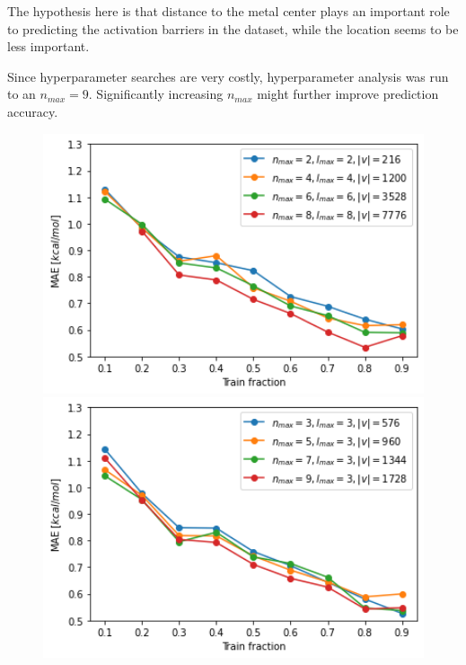 The hypothesis here is that distance to the metal center plays an important role to predicting the activation
barriers in the dataset, while the location seems to be less important.

Since hyperparameter searches are very costly, hyperparameter analysis was run to an $n_{max} = 9$.
Significantly increasing $n_{max}$ might further improve prediction accuracy.

\begin{figure}[!htb]
    \includegraphics[width=1.0\textwidth]{figures/regression/snap/fixnl.png}
  \endminipage\hfill
    \includegraphics[width=1.0\textwidth]{figures/regression/snap/fixl.png}
  \endminipage\hfill

\end{figure}
